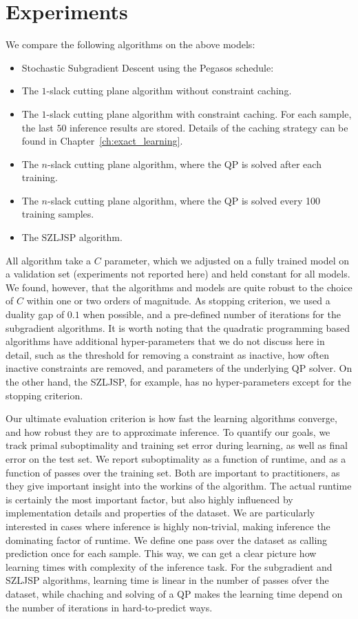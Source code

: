 \section{Experiments}
We compare the following algorithms on the above models:
\begin{itemize}
    \item Stochastic Subgradient Descent using the Pegasos schedule: %
    \item The $1$-slack cutting plane algorithm without constraint caching.
    \item The $1$-slack cutting plane algorithm with constraint caching. For
            each sample, the last $50$ inference results are stored.
            Details of the caching strategy can be found in Chapter~\ref{ch:exact_learning}.
    \item The $n$-slack cutting plane algorithm, where the QP is solved after each training.
    \item The $n$-slack cutting plane algorithm, where the QP is solved every 100 training samples.
    \item The SZLJSP algorithm.
\end{itemize}
All algorithm take a $C$ parameter, which we adjusted on a fully trained model
on a validation set (experiments not reported here) and held constant for all models.
We found, however, that the algorithms and models are quite robust to the choice of $C$ within
one or two orders of magnitude.
As stopping criterion, we used a duality gap of $0.1$ when possible, and a
pre-defined number of iterations for the subgradient algorithms. It is worth
noting that the quadratic programming based algorithms have additional
hyper-parameters that we do not discuss here in detail, such as the threshold
for removing a constraint as inactive, how often inactive constraints are
removed, and parameters of the underlying QP solver. On the other hand, the
SZLJSP, for example, has no hyper-parameters except for the stopping criterion.

Our ultimate evaluation criterion is how fast the learning algorithms converge,
and how robust they are to approximate inference.  To quantify our goals, we
track primal suboptimality and training set error during learning, as well as
final error on the test set.
We report suboptimality as a function of runtime, and as a function of passes
over the training set.  Both are important to practitioners, as they give
important insight into the workins of the algorithm.  The actual runtime is
certainly the most important factor, but also highly influenced by
implementation details and properties of the dataset. We are particularly
interested in cases where inference is highly non-trivial, making inference the
dominating factor of runtime.
We define one pass over the dataset as calling prediction once for each sample.
This way, we can get a clear picture how learning times with complexity of the
inference task. For the subgradient and SZLJSP algorithms, learning time is linear
in the number of passes ofver the dataset, while chaching and solving of a QP makes
the learning time depend on the number of iterations in hard-to-predict ways.

